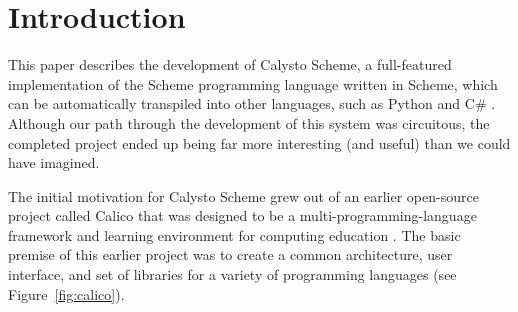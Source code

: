 \documentclass[acmsmall,screen,authorversion]{acmart}
\begin{document}



\maketitle

\section{Introduction}

This paper describes the development of Calysto Scheme, a full-featured
implementation of the Scheme programming language written in Scheme, which can
be automatically transpiled into other languages, such as Python and C\#
\cite{CalystoScheme}.  Although our path through the development of this system
was circuitous, the completed project ended up being far more interesting (and
useful) than we could have imagined.

The initial motivation for Calysto Scheme grew out of an earlier open-source
project called Calico that was designed to be a multi-programming-language
framework and learning environment for computing education \cite{Calico}.  The
basic premise of this earlier project was to create a common architecture, user
interface, and set of libraries for a variety of programming languages (see
Figure~\ref{fig:calico}).

\end{document}
